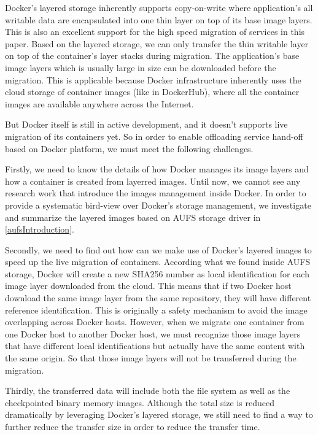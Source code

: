Docker's layered storage inherently supports copy-on-write where application's all writable data are encapsulated into one thin layer on top of its base image layers. This is also an excellent support for the high speed migration of services in this paper. Based on the layered storage, we can only transfer the thin writable layer on top of the container's layer stacks during migration. The application's base image layers which is usually large in size can be downloaded before the migration. This is applicable because Docker infrastructure inherently uses the cloud storage of container images (like in DockerHub), where all the container images are available anywhere across the Internet. 

But Docker itself is still in active development, and it doesn't supports live migration of its containers yet. So in order to enable offloading service hand-off based on Docker platform, we must meet the following challenges.

Firstly, we need to know the details of how Docker manages its image layers and how a container is created from layerred images. Until now, we cannot see any research work that introduce the images management inside Docker. In order to provide a systematic bird-view over Docker's storage management, we investigate and summarize the layered images based on AUFS storage driver in \ref{aufsIntroduction}.

Secondly, we need to find out how can we make use of Docker's layered images to speed up the live migration of containers. According what we found inside AUFS storage, Docker will create a new SHA256 number as local  identification for each image layer downloaded from the cloud. 
This means that if two Docker host download the same image layer from the same repository, they will have different reference identification. This is originally a safety mechanism to avoid the image overlapping across Docker hosts\cite{dockerlayer}. However, when we migrate one container from one Docker host to another Docker host, we must recognize those image layers that have different local identifications but actually have the same content with the same origin. So that those image layers will not be transferred during the migration.

Thirdly, the transferred data will include both the file system as well as the checkpointed binary memory images. Although the total size is reduced dramatically by leveraging Docker's layered storage, we still need to find a way to further reduce the transfer size in order to reduce the transfer time. 

